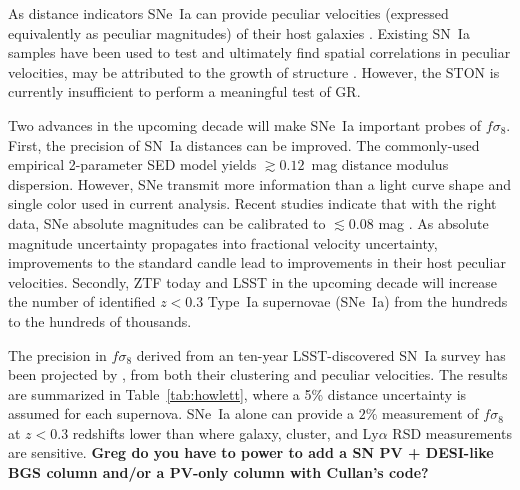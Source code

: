 \documentclass{aastex62}   	%
\begin{document}
As distance indicators SNe~Ia
can provide peculiar velocities (expressed equivalently as peculiar magnitudes)
of their host galaxies \citep{2006PhRvD..73l3526H,2011ApJ...741...67D}.  Existing SN~Ia samples
have been used to test and ultimately find spatial correlations in peculiar velocities, may be attributed to the growth of structure
\citet{2008MNRAS.389L..47A,2015JCAP...12..033H, 2017JCAP...05..015H}.  However, the STON is currently insufficient to perform a meaningful test of GR.

Two advances in the upcoming decade will make SNe~Ia  important probes of $f\sigma_8$.
First, the precision of SN~Ia distances can be improved.  The commonly-used empirical 2-parameter SED model yields $\gtrsim 0.12$~mag distance modulus
dispersion.  However, SNe transmit more information than a light curve shape and single color used in current analysis.
Recent studies indicate that with the right data, SNe absolute
magnitudes can be calibrated to $\lesssim 0.08$ mag \citep[see e.g.][]{2012MNRAS.425.1007B, 2015ApJ...815...58F}.
As absolute magnitude uncertainty propagates into fractional velocity uncertainty, improvements to the standard candle lead to
improvements in their host peculiar velocities.
Secondly,  ZTF today and LSST in the upcoming decade will increase the number of identified  $z<0.3$ Type~Ia supernovae (SNe~Ia)  from the hundreds to the
hundreds of thousands.

The precision in  $f\sigma_8$ derived from an ten-year LSST-discovered  SN~Ia survey has been projected by \citet{2017ApJ...847..128H},
from both their  clustering and peculiar velocities.
The results are summarized in Table~\ref{tab:howlett}, where a 5\% distance uncertainty is assumed for each supernova.
SNe~Ia alone can provide a $2\%$ measurement of $f\sigma_8$ at $z<0.3$ redshifts lower than where galaxy, cluster, and Ly$\alpha$
RSD measurements are sensitive.
{\bf Greg do you have to power to add a SN PV + DESI-like BGS column and/or a PV-only column with Cullan's code? }
\end{document}
